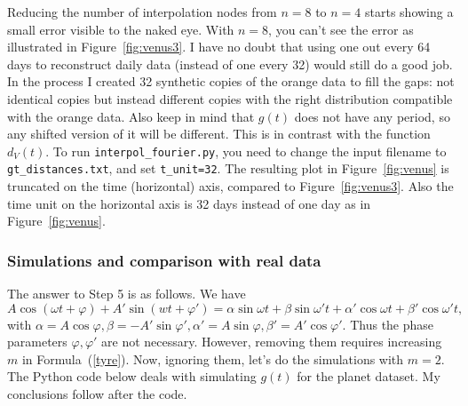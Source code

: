 \documentclass[oneside,10pt]{book}
\begin{document}
Reducing the number
 of interpolation \textcolor{index}{nodes} from $n=8$ to $n=4$ starts showing a small error visible to the naked eye. With $n=8$, you can't see the error
 as illustrated in Figure~\ref{fig:venus3}. I have no doubt that using one out every 64 days to reconstruct daily data (instead of one every 32) would still do a good job. In the process I created 32 synthetic copies of the orange data to fill the gaps: not identical copies but instead different copies with the right distribution compatible
 with the orange data. Also keep in mind that $g(t)$ does not have any period, so any shifted version of it will be different. This is
 in contrast with the function $d_V(t)$. To run \texttt{interpol\_fourier.py}, you need to change the input filename to \texttt{gt\_distances.txt}, and set \texttt{t\_unit=32}. The resulting plot in Figure~\ref{fig:venus} is truncated on the time (horizontal) axis, compared to Figure~\ref{fig:venus3}. Also the time unit on the horizontal axis is 32 days instead of one day as in Figure~\ref{fig:venus}.


\subsubsection{Simulations and comparison with real data}

The answer to Step 5 is as follows. We have
$$
A\cos(\omega t+\varphi) + A'\sin(wt+\varphi') = \alpha \sin\omega t + \beta\sin \omega't + \alpha'\cos\omega t + \beta'\cos\omega' t,
$$
with $\alpha = A\cos\varphi, \beta = -A'\sin\varphi', \alpha' = A\sin\varphi, \beta' = A'\cos\varphi'$. Thus the phase parameters 
$\varphi,\varphi'$ are not necessary. However, removing them requires increasing $m$ in Formula~(\ref{tyre}). Now, ignoring them, let's do the simulations with $m=2$. The Python code below deals with simulating $g(t)$ for the planet dataset. My conclusions follow after the code.
\vspace{1ex}

\end{document}
